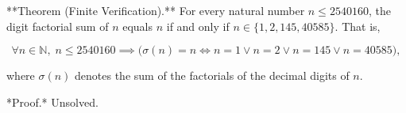 
**Theorem (Finite Verification).** For every natural number $n \leq 2540160$, the digit factorial sum of $n$ equals $n$ if and only if $n \in \{1, 2, 145, 40585\}$. That is,

$$\forall n \in \mathbb{N},\; n \leq 2540160 \implies \bigl(\sigma(n) = n \iff n = 1 \lor n = 2 \lor n = 145 \lor n = 40585\bigr),$$

where $\sigma(n)$ denotes the sum of the factorials of the decimal digits of $n$.

*Proof.* Unsolved.